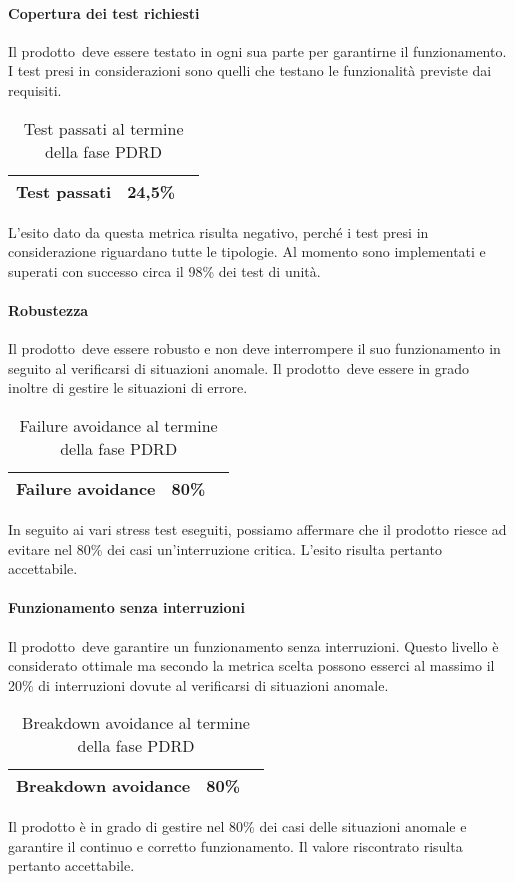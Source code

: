 \documentclass[../PianoDiQualifica.tex]{subfiles}
\begin{document}
\begin{appendices}
			\paragraph{Copertura dei test richiesti}
				Il prodotto\g\ deve essere testato in ogni sua parte per garantirne il funzionamento. I test presi in considerazioni sono quelli che testano le funzionalità previste dai requisiti.
			\begin{table}[H]
				\centering
				\begin{tabular}{l * {2}{c}}
					\midrule
					Test passati & 24,5\% \\
					\midrule
				\end{tabular}
				\caption{Test passati al termine della fase PDRD}
				\label{tab:copertura_test}
			\end{table}
			L'esito dato da questa metrica risulta negativo, perché i test presi in considerazione riguardano tutte le tipologie. Al momento sono implementati e superati con successo circa il 98\% dei test di unità. 
			
			\paragraph{Robustezza}
				Il prodotto\g\ deve essere robusto e non deve interrompere il suo funzionamento in seguito al verificarsi di situazioni anomale\g. Il prodotto\g\ deve essere in grado inoltre di gestire le situazioni di errore.
			\begin{table}[H]
				\centering
				\begin{tabular}{l * {2}{c}}
					\midrule
					Failure avoidance & 80\% \\
					\midrule
				\end{tabular}
				\caption{Failure avoidance al termine della fase PDRD}
				\label{tab:failure_avoidance}
			\end{table}
			In seguito ai vari stress test eseguiti, possiamo affermare che il prodotto riesce ad evitare nel 80\% dei casi un'interruzione critica. L'esito risulta pertanto accettabile. 
			
			\paragraph{Funzionamento senza interruzioni}
				Il prodotto\g\ deve garantire un funzionamento senza interruzioni. Questo livello è considerato ottimale ma secondo la metrica scelta possono esserci al massimo il 20\% di interruzioni dovute al verificarsi di situazioni anomale\g.
			\begin{table}[H]
				\centering
				\begin{tabular}{l * {2}{c}}
					\midrule
					Breakdown avoidance & 80\% \\
					\midrule
				\end{tabular}
				\caption{Breakdown avoidance al termine della fase PDRD}
				\label{tab:breakdown_avoidance}
			\end{table}	
			Il prodotto è in grado di gestire nel 80\% dei casi delle situazioni anomale e garantire il continuo e corretto funzionamento. Il valore riscontrato risulta pertanto accettabile.	
\end{appendices}
\end{document}
